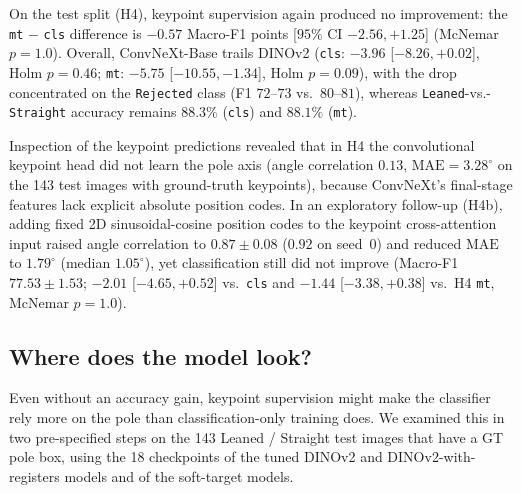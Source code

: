 \documentclass[11pt]{article}
\newcommand{\cls}{\texttt{cls}}
\newcommand{\mt}{\texttt{mt}}
\begin{document}
On the test split (H4), keypoint supervision again produced no improvement: the \mt{} $-$ \cls{} difference is $-0.57$ Macro-F1 points [$95\%$ CI $-2.56, +1.25$] (McNemar $p = 1.0$). Overall, ConvNeXt-Base trails DINOv2 (\cls{}: $-3.96$ [$-8.26, +0.02$], Holm $p = 0.46$; \mt{}: $-5.75$ [$-10.55, -1.34$], Holm $p = 0.09$), with the drop concentrated on the \texttt{Rejected} class (F1 $72$--$73$ vs.\ $80$--$81$), whereas \texttt{Leaned}-vs.-\texttt{Straight} accuracy remains $88.3\%$ (\cls{}) and $88.1\%$ (\mt{}).

Inspection of the keypoint predictions revealed that in H4 the convolutional keypoint head did not learn the pole axis (angle correlation $0.13$, $\text{MAE} = 3.28^\circ$ on the 143 test images with ground-truth keypoints), because ConvNeXt's final-stage features lack explicit absolute position codes. In an exploratory follow-up (H4b), adding fixed 2D sinusoidal-cosine position codes to the keypoint cross-attention input raised angle correlation to $0.87 \pm 0.08$ ($0.92$ on seed~0) and reduced $\text{MAE}$ to $1.79^\circ$ (median $1.05^\circ$), yet classification still did not improve (Macro-F1 $77.53 \pm 1.53$; $-2.01$ [$-4.65, +0.52$] vs.\ \cls{} and $-1.44$ [$-3.38, +0.38$] vs.\ H4 \mt{}, McNemar $p = 1.0$).

\subsection{Where does the model look?}
\label{sec:xai}
Even without an accuracy gain, keypoint supervision might make the classifier rely more on the pole than
classification-only training does. We examined this in two pre-specified steps on the 143 Leaned / Straight
test images that have a GT pole box, using the 18 checkpoints of the tuned DINOv2 and DINOv2-with-registers
models and of the soft-target models.
\end{document}
